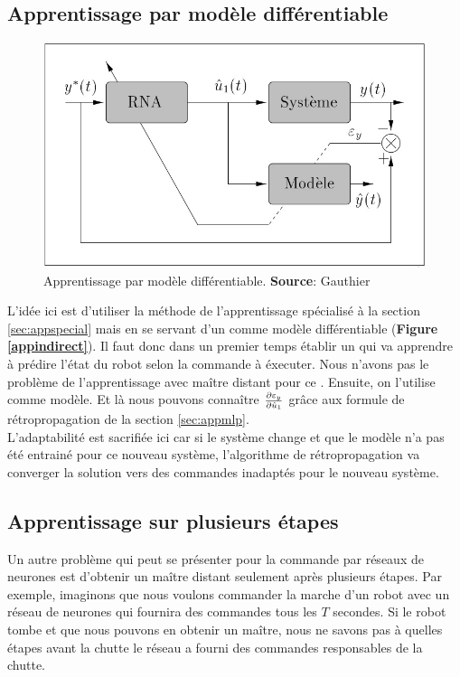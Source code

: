\subsection{Apprentissage par modèle différentiable}\label{sec:appmodele}
\begin{figure}
 \centering
 \includegraphics[scale=0.5]{../figures/modelediferentiable.jpg}
 \caption{Apprentissage par modèle différentiable. \textbf{Source}: Gauthier\cite{Gauthier}}
 \label{appmodele}
\end{figure}

L'idée ici est d'utiliser la méthode de l'apprentissage spécialisé à la section \ref{sec:appspecial} mais en se servant d'un \rna comme modèle différentiable (\textbf{Figure \ref{appindirect}}).
Il faut donc dans un premier temps établir un \rna qui va apprendre à prédire l'état du robot selon la commande à éxecuter.
Nous n'avons pas le problème de l'apprentissage avec maître distant pour ce \rna.
Ensuite, on l'utilise comme modèle. Et là nous pouvons connaître $\frac{\partial \varepsilon_y}{\partial \hat{u}_1}$ grâce aux formule de rétropropagation de la section \ref{sec:appmlp}.\\

L'adaptabilité est sacrifiée ici car si le système change et que le modèle n'a pas été entrainé pour ce nouveau système, l'algorithme de rétropropagation va converger la solution vers des commandes inadaptés pour le nouveau système.

\subsection{Apprentissage sur plusieurs étapes}
Un autre problème qui peut se présenter pour la commande par réseaux de neurones est d'obtenir un maître distant seulement après plusieurs étapes.
Par exemple, imaginons que nous voulons commander la marche d'un robot avec un réseau de neurones qui fournira des commandes tous les $T$ secondes.
Si le robot tombe et que nous pouvons en obtenir un maître, nous ne savons pas à quelles étapes avant la chutte le réseau a fourni des commandes responsables de la chutte.\\


